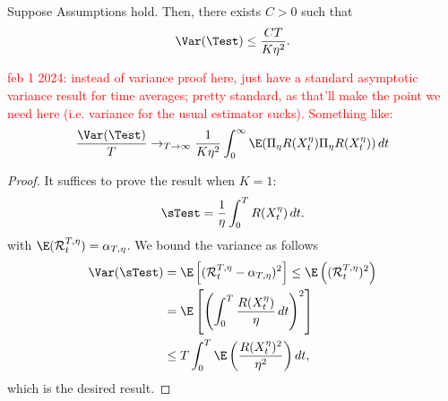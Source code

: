 \begin{proposition}
\label{prop:var_usual_estimator}
	Suppose Assumptions  hold. Then, there exists $C>0$ such that
	\begin{equation}
		\Var(\Test) \leq \frac{CT}{K\eta^2}.
	\end{equation}
\end{proposition}

\textcolor{red}{feb 1 2024: instead of variance proof here, just have a standard asymptotic variance result for time averages; pretty standard, as that'll make the point we need here (i.e. variance for the usual estimator sucks). Something like:
%
\begin{equation}
	\frac{\Var(\Test)}{T} \to_{T\to\infty} \frac{1}{K\eta^2}\int_0^\infty \E(\Pi_\eta R(X_t^\eta)\Pi_\eta R(X_t^\eta)) \, dt
\end{equation}
}

\begin{proof}
It suffices to prove the result when $K=1$:
%
\begin{equation}
	\sTest = \frac{1}{\eta}\int_0^T R(X_t^\eta) \, dt.
	\label{eq:sT_estimator}
\end{equation}
%
with $\E(\mathcal{R}_t^{T,\eta}) = \alpha_{T,\eta}$. We bound the variance as follows
%
\begin{align}
	\Var(\sTest) &= \E\left[(\mathcal{R}_t^{T,\eta} - \alpha_{T,\eta})^2\right] \leq \E\left((\mathcal{R}_t^{T,\eta})^2\right) \\
	&= \E\left[\left(\int_0^T \frac{R(X_t^\eta)}{\eta} \, dt\right)^2\right] \\
	&\leq T\int_0^T \E\left(\frac{R(X_t^\eta)^2}{\eta^2}\right) dt,
\end{align}
%
which is the desired result.
\end{proof}

